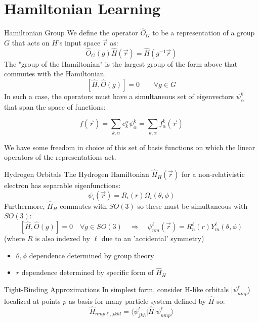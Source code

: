 \documentclass[11pt]{beamer}
\begin{document}
\section{Hamiltonian Learning}

\begin{frame}{Hamiltonian Group}
	We define the operator $\hat{O}_G$ to be a representation of a group $G$ that acts on $H$'s input space $\vec{r}$ as:
	$$
	\hat{O}_G(g)\hat{H}(\vec{r}) = \hat{H}(g^{-1}\vec{r})
	$$
	The "group of the Hamiltonian" is the largest group of the form above that commutes with the Hamiltonian.
	$$
	[\hat{H},\hat{O}(g)] = 0 \quad \quad \forall g \in G
	$$
	In such a case, the operators must have a simultaneous set of eigenvectors $\psi^{k}_{\alpha}$ that span the space of functions:
	
	$$
	f(\vec{r})=\sum_{k,\alpha}c_{k}^{\alpha}\psi^{k}_{\alpha} =\sum_{k,\alpha}f^k_{\alpha}(\vec{r})
	$$
	
	\medskip
	
	We have some freedom in choice of this set of basis functions on which the linear operators of the representations act.
\end{frame}
\begin{frame}{Hydrogen Orbitals}
The Hydrogen Hamiltonian $\hat{H}_H(\vec{r})$ for a non-relativistic electron has separable eigenfunctions:
$$
\psi_i(\vec{r})=R_i(r)\Omega_i(\theta,\phi)
$$
Furthermore, $\hat{H}_H$ commutes with $SO(3)$ so these must be simultaneous with $SO(3)$:
{\small
$$
[\hat{H},\hat{O}(g)] = 0 \quad \forall g \in SO(3) \quad \Rightarrow \quad \psi_{nm}^{\ell}(\vec{r})=R_{n}^{\ell}(r)Y^{\ell}_{m}(\theta,\phi)
$$
 (where $R$ is also indexed by $\ell$ due to an 'accidental' symmetry) }

\vspace{0.4cm}

\begin{itemize}
	\item  $\theta,\phi$ dependence determined by group theory
	\item  $r$ dependence determined by specific form of $\hat{H}_H$
\end{itemize}
\end{frame}
\begin{frame}{Tight-Binding Approximations}
In simplest form, consider H-like orbitals $\vert \psi_{nmp}^{\ell}\rangle$ localized at points $p$ as basis for many particle system defined by $\hat{H}$ so:
$$
\hat{H}_{nmp\ell,jkhl}=\langle \psi_{jkh}^l\vert\hat{H}\vert\psi_{nmp}^{\ell}\rangle
$$

\end{frame}
\end{document}

